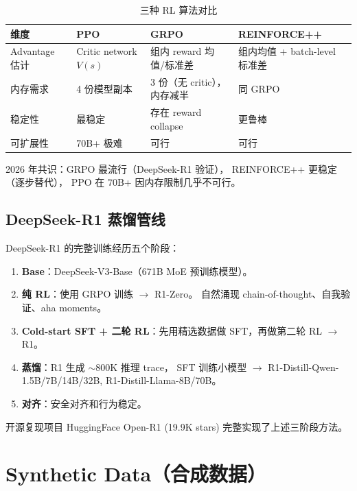 \documentclass[
  customlatinfont = macos,
]{hkustthesis}
\begin{document}
\begin{table}[H]
\centering\small
\caption{三种 RL 算法对比}
\label{tab:rl-compare}
\begin{tabularx}{\linewidth}{l X X X}
\toprule
\textbf{维度} & \textbf{PPO} & \textbf{GRPO} & \textbf{REINFORCE++} \\
\midrule
Advantage 估计 & Critic network $V(s)$ & 组内 reward 均值/标准差 & 组内均值 + batch-level 标准差 \\
内存需求 & 4 份模型副本 & 3 份（无 critic），内存减半 & 同 GRPO \\
稳定性 & 最稳定 & 存在 reward collapse & 更鲁棒 \\
可扩展性 & 70B+ 极难 & 可行 & 可行 \\
\bottomrule
\end{tabularx}
\end{table}

2026 年共识：GRPO 最流行（DeepSeek-R1 验证），
REINFORCE++ 更稳定（逐步替代），
PPO 在 70B+ 因内存限制几乎不可行。

\section{DeepSeek-R1 蒸馏管线}

DeepSeek-R1 的完整训练经历五个阶段：
\begin{enumerate}[noitemsep]
  \item \textbf{Base}：DeepSeek-V3-Base（671B MoE 预训练模型）。
  \item \textbf{纯 RL}：使用 GRPO 训练 $\to$ R1-Zero。
        自然涌现 chain-of-thought、自我验证、aha moments。
  \item \textbf{Cold-start SFT + 二轮 RL}：先用精选数据做 SFT，再做第二轮 RL $\to$ R1。
  \item \textbf{蒸馏}：R1 生成 $\sim$800K 推理 trace，
        SFT 训练小模型 $\to$ R1-Distill-Qwen-1.5B/7B/14B/32B,
        R1-Distill-Llama-8B/70B。
  \item \textbf{对齐}：安全对齐和行为稳定。
\end{enumerate}

开源复现项目 HuggingFace Open-R1 (19.9K stars)
完整实现了上述三阶段方法。


\chapter{Synthetic Data（合成数据）}
\label{ch:synthetic}
\end{document}
